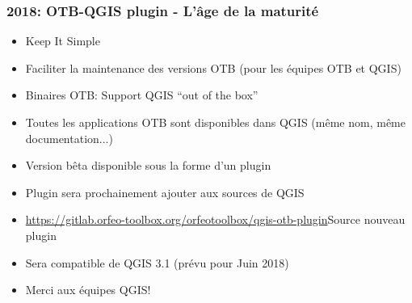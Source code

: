 \documentclass[8pt]{beamer}
\begin{document}
\begin{frame}
  \frametitle{2018: OTB-QGIS plugin - L'âge de la maturité}
  \begin{itemize}
  \item Keep It Simple
  \item Faciliter la maintenance des versions OTB (pour les équipes OTB et QGIS)
  \item Binaires OTB: Support QGIS ``out of the box''
  \item Toutes les applications OTB sont disponibles dans QGIS (même nom, même documentation...)  
  \item \alert{Version bêta} disponible sous la forme d'un plugin
  \item Plugin sera prochainement ajouter aux sources de QGIS
  \item
    \href{https://gitlab.orfeo-toolbox.org/orfeotoolbox/qgis-otb-plugin}{https://gitlab.orfeo-toolbox.org/orfeotoolbox/qgis-otb-plugin}{Source
      nouveau plugin}
  \item Sera compatible de QGIS 3.1 (prévu pour Juin 2018)
  \item Merci aux équipes QGIS!
  \end{itemize}
\end{frame}
\end{document}
